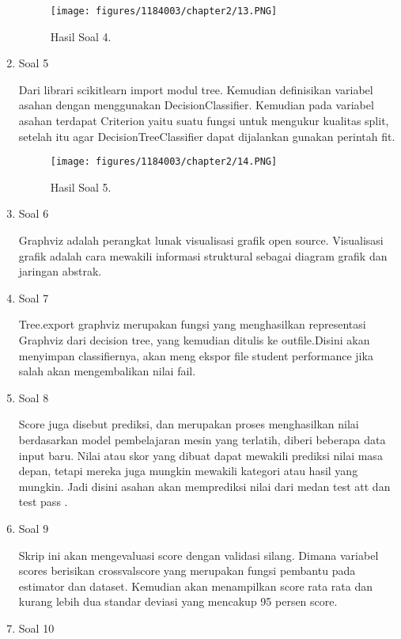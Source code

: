 \begin{enumerate}
	\begin{figure}[h]
	\centering
		\texttt{[image: figures/1184003/chapter2/13.PNG]}
		\caption{Hasil Soal 4.}
	\end{figure}
	\item Soal 5
	\hfill\break
	
	Dari librari scikitlearn import modul tree. Kemudian definisikan variabel asahan dengan menggunakan DecisionClassifier. Kemudian pada variabel asahan terdapat Criterion yaitu suatu fungsi untuk mengukur kualitas split, setelah itu agar DecisionTreeClassifier dapat dijalankan gunakan perintah fit.
	\begin{figure}[h]
	\centering
		\texttt{[image: figures/1184003/chapter2/14.PNG]}
		\caption{Hasil Soal 5.}
	\end{figure}
\item Soal 6
	\hfill\break
	
	Graphviz adalah perangkat lunak visualisasi grafik open source. Visualisasi grafik adalah cara mewakili informasi struktural sebagai diagram grafik dan jaringan abstrak. 
	\item Soal 7
	\hfill\break
	
	Tree.export graphviz merupakan fungsi yang menghasilkan representasi Graphviz dari decision tree, yang kemudian ditulis ke outfile.Disini akan menyimpan classifiernya, akan meng ekspor file student performance jika salah akan mengembalikan nilai fail. 
	\item Soal 8
	\hfill\break
	
	Score juga disebut prediksi, dan merupakan proses menghasilkan nilai berdasarkan model pembelajaran mesin yang terlatih, diberi beberapa data input baru. Nilai atau skor yang dibuat dapat mewakili prediksi nilai masa depan, tetapi mereka juga mungkin mewakili kategori atau hasil yang mungkin. Jadi disini asahan akan memprediksi nilai dari medan test att dan test pass .
\item Soal 9
	\hfill\break
	
	Skrip ini akan mengevaluasi score dengan validasi silang. Dimana variabel scores berisikan crossvalscore yang merupakan fungsi pembantu pada estimator dan dataset. Kemudian akan menampilkan score rata rata dan kurang lebih dua standar deviasi yang mencakup 95 persen score. 
	\item Soal 10
	\hfill\break
	

\end{enumerate}
